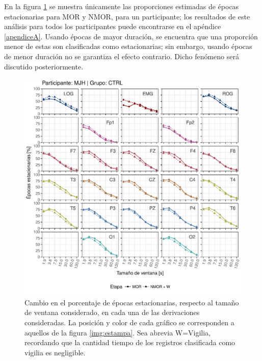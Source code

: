 En la figura \ref{cabeza_repoio} se muestra únicamente las proporciones estimadas de épocas estacionarias para MOR y NMOR, para un participante; los resultados de este análisis para todos los participantes puede encontrarse en el apéndice \ref{apendiceA}.
%
Usando épocas de mayor duración, se encuentra que una proporción menor de estas son clasificadas como estacionarias; sin embargo, usando épocas de menor duración no se garantiza el efecto contrario.
%
% 
%
Dicho fenómeno será discutido posteriormente.

\begin{figure}
\centering
\includegraphics[width=\linewidth]{./scripts_graf_res/MJNNVIGILOS_cabeza_epocas_v2.pdf}
\caption{Cambio en el porcentaje de épocas estacionarias, respecto al tamaño de ventana considerado, en cada una de las derivaciones consideradas. La posición y color de cada gráfico se corresponden a aquellos de la figura \ref{img:estampa}. Sea abrevia W=Vigilia, recordando que la cantidad tiempo de los registros clasificada como vigilia es negligible.}
\label{cabeza_repoio}
\end{figure}

